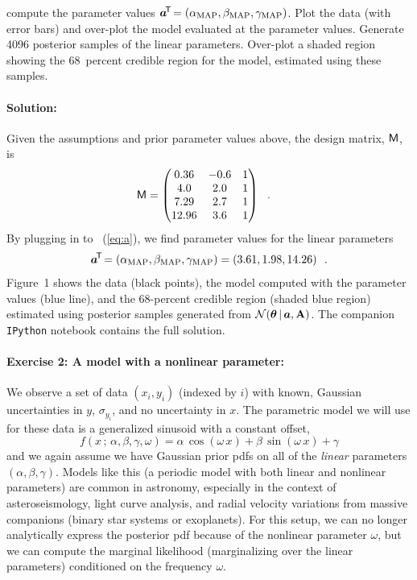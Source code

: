 compute the  parameter values $\boldsymbol{a}^{\!\mathsf{T}\!} = (\alpha_{\rm MAP}, \beta_{\rm MAP},
\gamma_{\rm MAP})$.
Plot the data (with error bars) and over-plot the model evaluated at the
 parameter values.
Generate 4096 posterior samples of the linear parameters.
Over-plot a shaded region showing the 68~percent credible region for the model,
estimated using these samples.

\paragraph{Solution:} Given the assumptions and prior parameter values
above, the design matrix, $\mathsf{M}$, is
\begin{align}
  \mathsf{M} &= \begin{pmatrix}
      0.36 & -0.6 & 1\\
      4.0 & 2.0 & 1\\
      7.29 & 2.7 & 1\\
      12.96 & 3.6 & 1
    \end{pmatrix} ~~.
\end{align}
By plugging in to \equationname~(\ref{eq:a}), we find  parameter values for the
linear parameters
\begin{equation}
  \boldsymbol{a}^{\!\mathsf{T}\!} =
    (\alpha_{\rm MAP}, \beta_{\rm MAP}, \gamma_{\rm MAP}) =
      (3.61, 1.98, 14.26) ~~.
\end{equation}
Figure~1 shows the data (black points), the model computed with
the  parameter values (blue line), and the 68-percent credible region (shaded
blue region) estimated using posterior samples generated from
$\mathcal{N}\!\,(\boldsymbol{\theta}\,|\,\boldsymbol{a},\mathbf{A})$.
The companion \texttt{IPython} notebook contains the full solution.


\paragraph{Exercise 2: A model with a nonlinear parameter:} We
observe a set of data $(x_i, y_i)$ (indexed by $i$) with
known, Gaussian uncertainties in $y$, $\sigma_{y_i}$, and no uncertainty in $x$.
The parametric model we will use for these data is a generalized sinusoid with a
constant offset,
\begin{equation}
  f(x \,;\, \alpha, \beta, \gamma, \omega) =
    \alpha\,\cos(\omega \, x) + \beta\,\sin(\omega \, x) + \gamma \label{eq:ex2model}
\end{equation}
and we again assume we have Gaussian prior pdfs on all of the \emph{linear}
parameters $(\alpha, \beta, \gamma)$.
Models like this (a periodic model with both linear and nonlinear parameters)
are common in astronomy, especially in the context of asteroseismology, light
curve analysis, and radial velocity variations from massive companions (binary
star systems or exoplanets).
For this setup, we can no longer analytically express the posterior pdf because
of the nonlinear parameter $\omega$, but we can compute the marginal likelihood
(marginalizing over the linear parameters) conditioned on the frequency
$\omega$.

